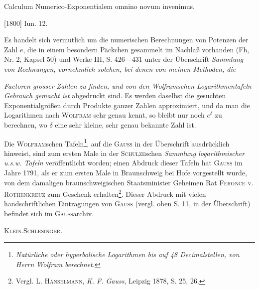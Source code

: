 \indent Calculum Numerico-Exponentialem omnino novum invenimus.
\par\noindent\hfill[1800] Iun. 12.

\medskip\begingroup\small
\indent Es handelt sich vermutlich um die numerischen Berechnungen von Potenzen der Zahl \(e\), die in einem besondern Päckchen gesammelt im Nachlaß vorhanden (Fh, Nr. 2, Kapsel 50) und Werke III, S. 426—431 unter der Überschrift \textit{Sammlung von Rechnungen, vornehmlich solchen, bei denen von meinen Methoden, die}
\par\endgroup

\clearpage{}
\begingroup\small
\renewcommand{\thefootnote}{*)}
\noindent\textit{Factoren grosser Zahlen zu finden, und von den Wolframschen Logarithmentafeln Gebrauch gemacht ist} abgedruckt sind. Es werden daselbst die gesuchten Exponentialgrößen durch Produkte ganzer Zahlen approximiert, und da man die Logarithmen nach \textsc{Wolfram} sehr genau kennt, so bleibt nur noch \(e^\delta\) zu berechnen, wo \(\delta\) eine sehr kleine, sehr genau bekannte Zahl ist.
\par\indent Die \textsc{Wolfram}schen Tafeln\footnote{\textit{Natürliche oder hyperbolische Logarithmen bis auf 48 Decimalstellen, von Herrn Wolfram berechnet.}}, auf die \textsc{Gauss} in der Überschrift ausdrücklich hinweist, sind zum ersten Male in der \textsc{Schulze}schen \textit{Sammlung logarithmischer u.s.w. Tafeln} veröffentlicht worden; einen Abdruck dieser Tafeln hat \textsc{Gauss} im Jahre 1791, als er zum ersten Male in Braunschweig bei Hofe vorgestellt wurde, von dem damaligen braunschweigischen Staatsminister Geheimen Rat \textsc{Feronce v. Rothenkreuz} zum Geschenk erhalten\renewcommand{\thefootnote}{**)}\footnote{Vergl. \textsc{L. Hänselmann}, \textit{K. F. Gauss}, Leipzig 1878, S. 25, 26.}. Dieser Abdruck mit vielen handschriftlichen Eintragungen von \textsc{Gauss} (vergl. oben S. 11, in der Überschrift) befindet sich im \textsc{Gauss}archiv.
\par\noindent\hfill\textsc{Klein.\quad Schlesinger.}
\par\endgroup
